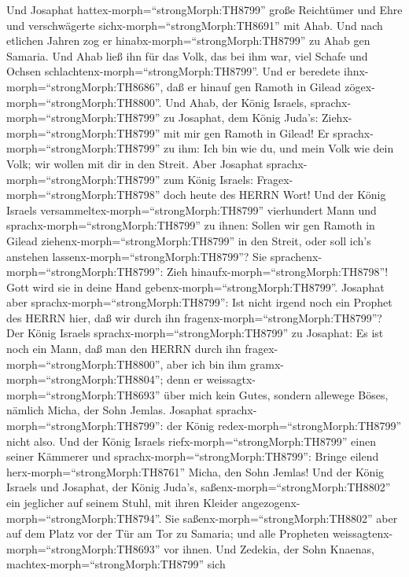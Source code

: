 Und Josaphat hattex-morph=``strongMorph:TH8799'' große
Reichtümer und Ehre und verschwägerte sichx-morph=``strongMorph:TH8691''
mit Ahab.  Und nach etlichen Jahren zog er
hinabx-morph=``strongMorph:TH8799'' zu Ahab gen Samaria. Und Ahab ließ
ihn für das Volk, das bei ihm war, viel Schafe und Ochsen
schlachtenx-morph=``strongMorph:TH8799''. Und er beredete
ihnx-morph=``strongMorph:TH8686'', daß er hinauf gen Ramoth in Gilead
zögex-morph=``strongMorph:TH8800''.  Und Ahab, der König
Israels, sprachx-morph=``strongMorph:TH8799'' zu Josaphat, dem König
Juda's: Ziehx-morph=``strongMorph:TH8799'' mit mir gen Ramoth in Gilead!
Er sprachx-morph=``strongMorph:TH8799'' zu ihm: Ich bin wie du, und mein
Volk wie dein Volk; wir wollen mit dir in den Streit.  Aber
Josaphat sprachx-morph=``strongMorph:TH8799'' zum König Israels:
Fragex-morph=``strongMorph:TH8798'' doch heute des HERRN Wort!
 Und der König Israels
versammeltex-morph=``strongMorph:TH8799'' vierhundert Mann und
sprachx-morph=``strongMorph:TH8799'' zu ihnen: Sollen wir gen Ramoth in
Gilead ziehenx-morph=``strongMorph:TH8799'' in den Streit, oder soll
ich's anstehen lassenx-morph=``strongMorph:TH8799''? Sie
sprachenx-morph=``strongMorph:TH8799'': Zieh
hinaufx-morph=``strongMorph:TH8798''! Gott wird sie in deine Hand
gebenx-morph=``strongMorph:TH8799''.  Josaphat aber
sprachx-morph=``strongMorph:TH8799'': Ist nicht irgend noch ein Prophet
des HERRN hier, daß wir durch ihn fragenx-morph=``strongMorph:TH8799''?
 Der König Israels sprachx-morph=``strongMorph:TH8799'' zu
Josaphat: Es ist noch ein Mann, daß man den HERRN durch ihn
fragex-morph=``strongMorph:TH8800'', aber ich bin ihm
gramx-morph=``strongMorph:TH8804''; denn er
weissagtx-morph=``strongMorph:TH8693'' über mich kein Gutes, sondern
allewege Böses, nämlich Micha, der Sohn Jemlas. Josaphat
sprachx-morph=``strongMorph:TH8799'': der König
redex-morph=``strongMorph:TH8799'' nicht also.  Und der
König Israels riefx-morph=``strongMorph:TH8799'' einen seiner Kämmerer
und sprachx-morph=``strongMorph:TH8799'': Bringe eilend
herx-morph=``strongMorph:TH8761'' Micha, den Sohn Jemlas! 
Und der König Israels und Josaphat, der König Juda's,
saßenx-morph=``strongMorph:TH8802'' ein jeglicher auf seinem Stuhl, mit
ihren Kleider angezogenx-morph=``strongMorph:TH8794''. Sie
saßenx-morph=``strongMorph:TH8802'' aber auf dem Platz vor der Tür am
Tor zu Samaria; und alle Propheten
weissagtenx-morph=``strongMorph:TH8693'' vor ihnen.  Und
Zedekia, der Sohn Knaenas, machtex-morph=``strongMorph:TH8799'' sich
